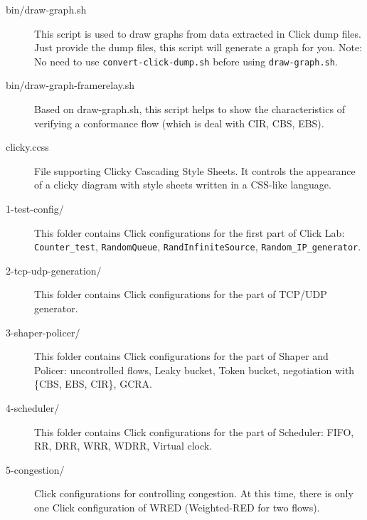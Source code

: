 \documentclass[a4paper]{article}
\begin{document}
\begin{description}
      	\item[bin/draw-graph.sh] This script is used to draw graphs from data extracted in Click dump files. Just provide the dump files, this script will generate a graph for you. Note: No need to use \texttt{convert-click-dump.sh} before using \texttt{draw-graph.sh}.
      	\item[bin/draw-graph-framerelay.sh] Based on draw-graph.sh, this script helps to show the characteristics of verifying a conformance flow (which is deal with CIR, CBS, EBS).
      	\item[clicky.ccss] File supporting Clicky Cascading Style Sheets. It controls the appearance of a clicky diagram with style sheets written in a CSS-like language.      	
      	\item[1-test-config/] This folder contains Click configurations for the first part of Click Lab: \texttt{Counter\_test}, \texttt{RandomQueue}, \texttt{RandInfiniteSource}, \texttt{Random\_IP\_generator}.
      	\item[2-tcp-udp-generation/] This folder contains Click configurations for the part of TCP/UDP generator.
      	\item[3-shaper-policer/] This folder contains Click configurations for the part of Shaper and Policer: uncontrolled flows, Leaky bucket, Token bucket, negotiation with \{CBS, EBS, CIR\}, GCRA.
      	\item[4-scheduler/] This folder contains Click configurations for the part of Scheduler: FIFO, RR, DRR, WRR, WDRR, Virtual clock.
      	\item[5-congestion/] Click configurations for controlling congestion. At this time, there is only one Click configuration of WRED (Weighted-RED for two flows).
      \end{description}
    
\end{document}
